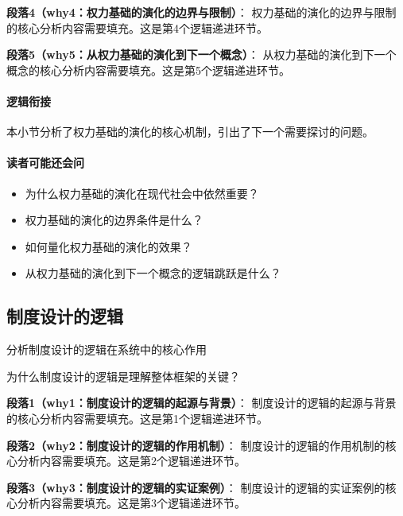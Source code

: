 \documentclass[../main.tex]{subfiles}
\begin{document}
\textbf{段落4（why4：权力基础的演化的边界与限制）}：
权力基础的演化的边界与限制的核心分析内容需要填充。这是第4个逻辑递进环节。


\textbf{段落5（why5：从权力基础的演化到下一个概念）}：
从权力基础的演化到下一个概念的核心分析内容需要填充。这是第5个逻辑递进环节。


\paragraph*{逻辑衔接}
本小节分析了权力基础的演化的核心机制，引出了下一个需要探讨的问题。

\paragraph*{读者可能还会问}
\begin{itemize}
\item 为什么权力基础的演化在现代社会中依然重要？
\item 权力基础的演化的边界条件是什么？
\item 如何量化权力基础的演化的效果？
\item 从权力基础的演化到下一个概念的逻辑跳跃是什么？
\end{itemize}


\subsection{制度设计的逻辑}

\begin{motivation}
分析制度设计的逻辑在系统中的核心作用
\end{motivation}

\begin{logicmap}
[逻辑链占位]
\end{logicmap}

\begin{questionbox}
为什么制度设计的逻辑是理解整体框架的关键？
\end{questionbox}

\textbf{段落1（why1：制度设计的逻辑的起源与背景）}：
制度设计的逻辑的起源与背景的核心分析内容需要填充。这是第1个逻辑递进环节。


\textbf{段落2（why2：制度设计的逻辑的作用机制）}：
制度设计的逻辑的作用机制的核心分析内容需要填充。这是第2个逻辑递进环节。


\textbf{段落3（why3：制度设计的逻辑的实证案例）}：
制度设计的逻辑的实证案例的核心分析内容需要填充。这是第3个逻辑递进环节。
\end{document}
